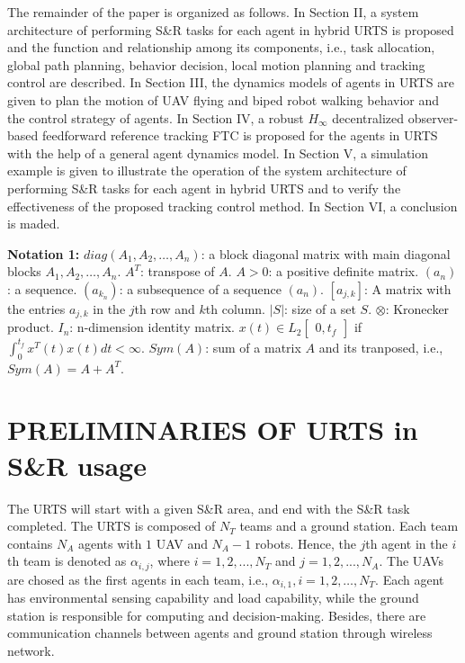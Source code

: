 \documentclass{ieeeaccess}
\begin{document}
The remainder of the paper is organized as follows. In Section II, a system architecture of performing S\&R tasks for each agent in hybrid URTS is proposed and the function and relationship among its components, i.e., task allocation, global path planning, behavior decision, local motion planning and tracking control are described. In Section III, the dynamics models of agents in URTS are given to plan the motion of UAV flying and biped robot walking behavior and the control strategy of agents. In Section IV, a robust $H_\infty$ decentralized observer-based feedforward reference tracking FTC is proposed for the agents in URTS with the help of a general agent dynamics model. In Section V, a simulation example is given to illustrate the operation of the system architecture of performing S\&R tasks for each agent in hybrid URTS and to verify the effectiveness of the proposed tracking control method. In Section VI, a conclusion is maded.

\textbf{Notation 1:} 
$diag(A_1, A_2, \dots, A_n)$: a block diagonal matrix with main diagonal blocks $A_1, A_2, \dots, A_n$. $A^T$: transpose of $A$. $A > 0$: a positive definite matrix. $(a_n)$: a sequence. $(a_{k_n})$: a subsequence of a sequence $(a_n)$. $[a_{j,k}]$: A matrix with the entries $a_{j,k}$ in the $j$th row and $k$th column. $\vert{S}\vert$: size of a set $S$. $\otimes$: Kronecker product. $I_n$: n-dimension identity matrix. $x(t)\in L_2\begin{bmatrix}
    0,t_f 
\end{bmatrix}$ if $\int^{t_f}_{0}x^T(t)x(t)dt<\infty$. $Sym(A)$: sum of a matrix $A$ and its tranposed, i.e., $Sym(A) = A+A^T$.

\section{PRELIMINARIES OF URTS in S\&R usage}
The URTS will start with a given S\&R area, and end with the S\&R task completed. The URTS is composed of $N_T$ teams and a ground station. Each team contains $N_A$ agents with $1$ UAV and $N_A-1$ robots. Hence, the $j$th agent in the $i$th team is denoted as $\alpha_{i,j}$, where $i=1,2,...,N_T$ and $j=1,2,...,N_A$. The UAVs are chosed as the first agents in each team, i.e., $\alpha_{i,1},i=1,2,\dots,N_T$. Each agent has environmental sensing capability and load capability, while the ground station is responsible for computing and decision-making. Besides, there are communication channels between agents and ground station through wireless network.
\end{document}
